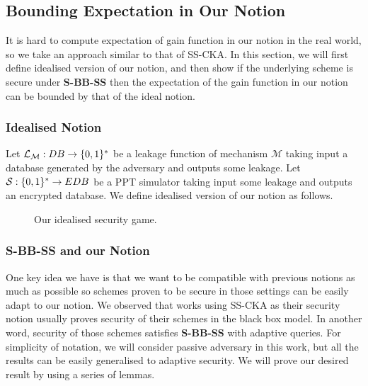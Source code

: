 \subsection{Bounding Expectation in Our Notion}
It is hard to compute expectation of gain function in our notion in the real world, so we take an approach similar to that of SS-CKA. In this section, we will first define idealised version of our notion, and then show if the underlying scheme is secure under \textbf{S-BB-SS} then the expectation of the gain function in our notion can be bounded by that of the ideal notion.




\subsubsection{Idealised Notion}
Let $\mathcal{L}_\mathcal{M}: DB \rightarrow \{0,1\}^{*}$ be a leakage function of mechanism $\mathcal{M}$ taking input a database generated by the adversary and outputs some leakage. Let $\mathcal{S}: \{0,1\}^{*} \rightarrow EDB$ be a PPT simulator taking input some leakage and outputs an encrypted database. We define idealised version of our notion as follows.

\begin{figure}[H]
	\begin{pchstack}[center]
	\end{pchstack}
	\caption{Our idealised security game.}
\end{figure}




\subsubsection{\textbf{S-BB-SS} and our Notion}
One key idea we have is that we want to be compatible with previous notions as much as possible so schemes proven to be secure in those settings can be easily adapt to our notion. We observed that works using SS-CKA as their security notion usually proves security of their schemes in the black box model. In another word, security of those schemes satisfies \textbf{S-BB-SS} with adaptive queries. For simplicity of notation, we will consider passive adversary in this work, but all the results can be easily generalised to adaptive security. We will prove our desired result by using a series of lemmas.


